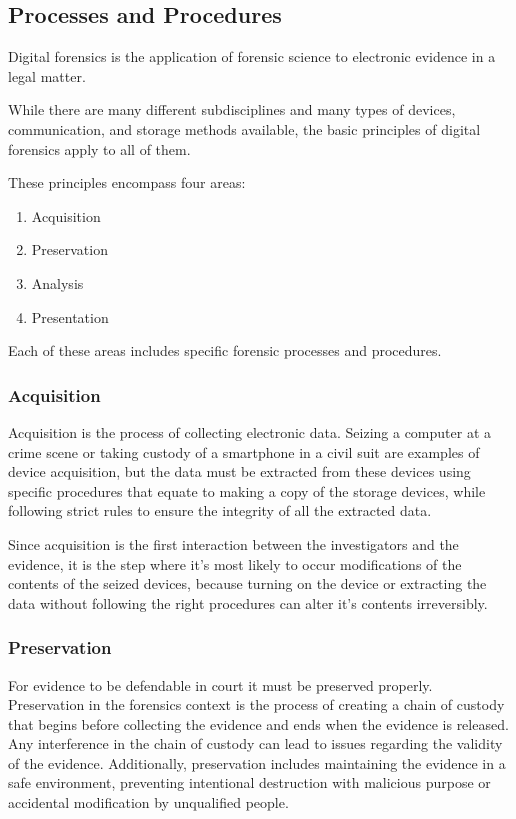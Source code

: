 \subsection{Processes and Procedures}

Digital forensics is the application of forensic science to electronic evidence in a
legal matter.

While there are many different subdisciplines and many types of devices, communication,
and storage methods available, the basic principles of digital forensics
apply to all of them.

These principles encompass four areas:

\begin{enumerate}
\item Acquisition
\item Preservation
\item Analysis
\item Presentation
\end{enumerate}

Each of these areas includes specific forensic processes and procedures.

\subsubsection{Acquisition}

Acquisition is the process of collecting electronic data. Seizing a computer at a crime scene or
taking custody of a smartphone in a civil suit are examples of device acquisition, but the data 
must be extracted from these devices using specific procedures that equate to making a copy of
the storage devices, while following strict rules to ensure the integrity of all the extracted data.

Since acquisition is the first interaction between the investigators and the evidence,
it is the step where it's most likely to occur modifications of the contents of the seized devices,
because turning on the device or extracting the data without following the right procedures can alter
it's contents irreversibly.

\subsubsection{Preservation}

For evidence to be defendable in court it must be preserved properly.
Preservation in the forensics context is the process of creating a chain of custody
that begins before collecting the evidence and ends when the evidence is released.
Any interference in the chain of custody can lead to issues regarding the validity of the evidence.
Additionally, preservation includes maintaining the evidence in a safe environment, preventing
intentional destruction with malicious purpose or accidental modification by unqualified people.

